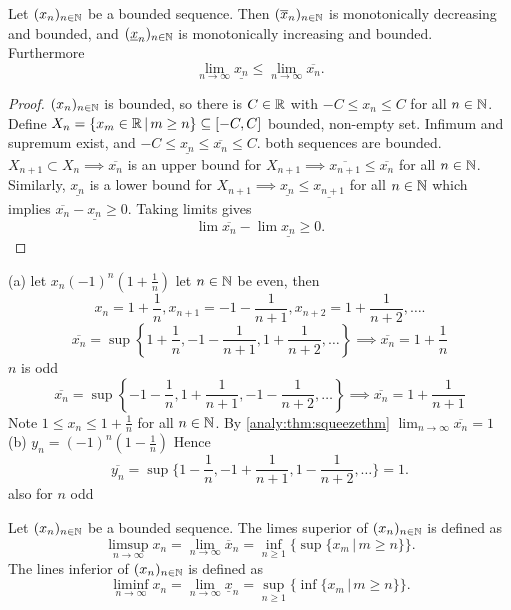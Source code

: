\documentclass[10pt, a4paper]{article}
\newcommand{\seq}[1][x]{(#1_n)_{n \in \N}}
\begin{document}
\begin{lemma}
    Let $\seq$ be a bounded sequence.
    Then $\seq[\overline{x}]$ is monotonically decreasing and bounded,
    and $\seq[\underline{x}]$ is monotonically increasing and bounded.
    Furthermore
    \[
    \lim_{n \rightarrow \infty}\underline{x_n} \leq \lim_{n \rightarrow \infty}\overline{x_n}.
    \]
    \begin{proof}
        $\seq$ is bounded,
        so there is $C \in \mathbb{R}$ with $-C \leq x_n \leq C$ for all $n \in \mathbb{N}$.
        Define $X_n = \{x_m \in \mathbb{R}\,|\, m \geq n\} \subseteq [-C, C]$ bounded,
        non-empty set.
        Infimum and supremum exist,
        and $-C \leq \underline{x_n} \leq \overline{x_n} \leq C$.
        both sequences are bounded.
        $X_{n + 1} \subset X_n \implies \overline{x_n}$ is an upper bound for $X_{n + 1} \implies \overline{x_{n + 1}} \leq \overline{x_n}$ for all $n \in \mathbb{N}$.
        Similarly,
        $\underline{x_n}$ is a lower bound for $X_{n + 1} \implies \underline{x_n} \leq \underline{x_{n + 1}}$ for all $n \in \mathbb{N}$ which implies $\overline{x_n} - \underline{x_n} \geq 0$.
        Taking limits gives
        \[
        \lim\overline{x_n} - \lim\underline{x_n} \geq 0.
        \]
    \end{proof}
\end{lemma}

\begin{example}
    (a) let $x_n (-1) ^ n \left(1 + \frac{1}{n}\right)$
    let $n \in \mathbb{N}$ be even,
    then
    \[
    x_n = 1 + \frac{1}{n}, x_{n + 1} = -1 - \frac{1}{n + 1}, x_{n + 2} = 1 + \frac{1}{n + 2}, \dotsc.
    \]
    \[
    \overline{x_n} = \sup\left\{1 + \frac{1}{n}, -1 - \frac{1}{n + 1}, 1 + \frac{1}{n + 2}, \dotsc\right\} \implies \overline{x_n} = 1 + \frac{1}{n}
    \]
    $n$ is odd
    \[
    \overline{x_n} = \sup\left\{-1 - \frac{1}{n}, 1 + \frac{1}{n + 1}, -1 - \frac{1}{n + 2}, \dotsc\right\} \implies \overline{x_n} = 1 + \frac{1}{n + 1}
    \]
    Note $1 \leq x_n \leq 1 + \frac{1}{n}$ for all $n \in \mathbb{N}$.
    By \autoref{analy:thm:squeezethm} $\lim_{n \rightarrow \infty}\overline{x_n} = 1$
    (b) $y_n = (-1) ^ n(1 - \frac{1}{n})$
    Hence
    \[
    \overline{y_n} = \sup\{1 - \frac{1}{n}, -1 + \frac{1}{n + 1}, 1 - \frac{1}{n + 2}, \dotsc\} = 1.
    \]
    also for $n$ odd
\end{example}

\begin{definition}
    Let $\seq$ be a bounded sequence.
    The limes superior of $\seq$ is defined as
    \[
    \limsup_{n \rightarrow \infty}{x_n} = \lim_{n \rightarrow \infty}\overline{x}_n = \inf_{n \geq 1}\{\sup{\{x_m\,|\, m \geq n\}}\}.
    \]
    The lines inferior of $\seq$ is defined as
    \[
    \liminf_{n \rightarrow \infty}{x_n} = \lim_{n \rightarrow \infty}{\underline{x}_n} = \sup_{n \geq 1}{\{\inf{\{x_m\,|\, m \geq n\}}\}}.
    \]
\end{definition}
\end{document}
